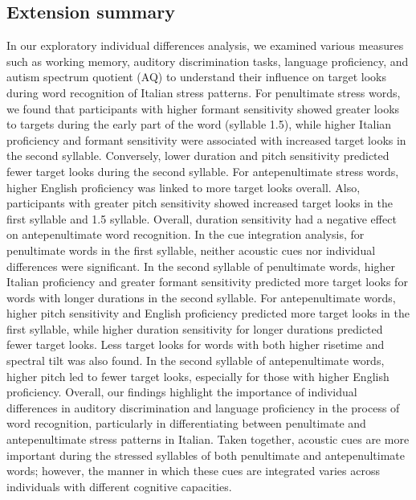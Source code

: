 \subsection{Extension summary}

In our exploratory individual differences analysis, we examined various measures such as working memory, auditory discrimination tasks, language proficiency, and autism spectrum quotient (AQ) to understand their influence on target looks during word recognition of Italian stress patterns. For penultimate stress words, we found that participants with higher formant sensitivity showed greater looks to targets during the early part of the word (syllable 1.5), while higher Italian proficiency and formant sensitivity were associated with increased target looks in the second syllable. Conversely, lower duration and pitch sensitivity predicted fewer target looks during the second syllable. For antepenultimate stress words, higher English proficiency was linked to more target looks overall. Also, participants with greater pitch sensitivity showed increased target looks in the first syllable and 1.5 syllable. Overall, duration sensitivity had a negative effect on antepenultimate word recognition. In the cue integration analysis, for penultimate words in the first syllable, neither acoustic cues nor individual differences were significant. In the second syllable of penultimate words, higher Italian proficiency and greater formant sensitivity predicted more target looks for words with longer durations in the second syllable. For antepenultimate words, higher pitch sensitivity and English proficiency predicted more target looks in the first syllable, while higher duration sensitivity for longer durations predicted fewer target looks. Less target looks for words with both higher risetime and spectral tilt was also found. In the second syllable of antepenultimate words, higher pitch led to fewer target looks, especially for those with higher English proficiency. Overall, our findings highlight the importance of individual differences in auditory discrimination and language proficiency in the process of word recognition, particularly in differentiating between penultimate and antepenultimate stress patterns in Italian. Taken together, acoustic cues are more important during the stressed syllables of both penultimate and antepenultimate words; however, the manner in which these cues are integrated varies across individuals with different cognitive capacities.
